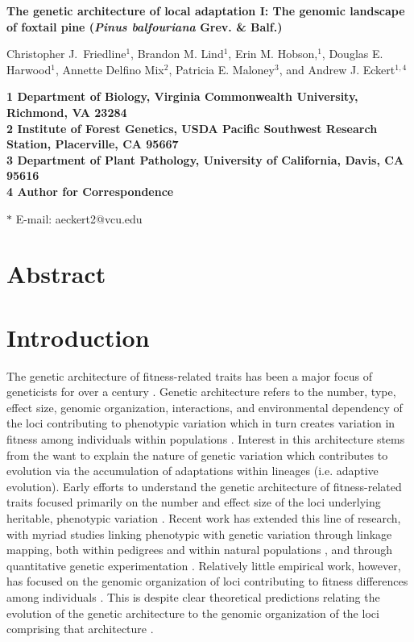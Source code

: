 \documentclass[11pt]{article}
\begin{document}
\begin{flushleft} 
\singlespacing
{\Large \textbf{The genetic architecture of local adaptation I: The genomic landscape of 
foxtail pine (\textit{Pinus balfouriana} Grev. \& Balf.)}}
\null

Christopher J.\ Friedline$^{1}$, 
Brandon M. Lind$^{1}$,
Erin M. Hobson,$^{1}$,
Douglas E. Harwood$^{1}$, 
Annette Delfino Mix$^{2}$,
Patricia E. Maloney$^{3}$, and
Andrew J. Eckert$^{1,4}$
\null

\bf{1} Department of Biology, Virginia Commonwealth University, Richmond, VA 23284
\\
\bf{2} Institute of Forest Genetics, USDA Pacific Southwest Research Station, Placerville, 
CA 95667
\\
\bf{3} Department of Plant Pathology, University of California, Davis, CA 95616
\\
\bf{4} Author for Correspondence
\null

$\ast$ E-mail: aeckert2@vcu.edu
\end{flushleft}

\section*{Abstract}

\section*{Introduction}
The genetic architecture of fitness-related traits has been a major focus of geneticists for 
over a century \citep[reviewed by][]{Ellegren:2008}. Genetic architecture refers to the number, type, effect size, 
genomic organization, interactions, and environmental dependency of the loci contributing to phenotypic variation 
which in turn creates variation in fitness among individuals within populations \citep[cf.][]{Eckert:2012a}. 
Interest in this architecture stems from the want to explain the nature of genetic variation which 
contributes to evolution via the accumulation of adaptations within lineages (i.e. adaptive evolution).
Early efforts to understand the genetic architecture of fitness-related traits
focused primarily on the number and effect size of the loci underlying heritable, phenotypic variation \citep{Fisher:1930}. 
Recent work has extended this line of research, with myriad studies linking phenotypic with genetic variation 
through linkage mapping, both within pedigrees \citep{Mauricio:2001, Neale:2011, Ritland:2011} and within 
natural populations \citep{Ingvarsson:2011, Eckert:2013a}, 
and through quantitative genetic experimentation \citep{Anderson:2013a, Anderson:2013b, Fournier-Level:2013}. Relatively 
little empirical work, however, has focused on the genomic organization of loci contributing to fitness differences 
among individuals \citep[but see][]{Stevison:2011}. This is despite clear theoretical predictions relating the evolution of 
the genetic architecture to the genomic organization of the loci comprising that architecture 
\citep{Kirkpatrick:2006, Yeaman:2011, Yeaman:2013}.
\end{document}
